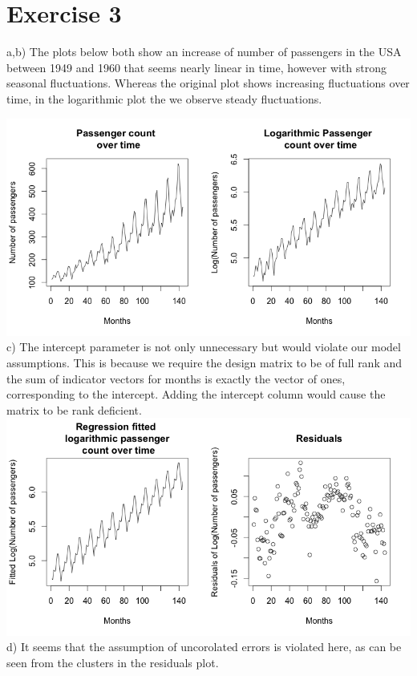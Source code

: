 \documentclass[a4paper,12pt]{article}
\begin{document}
\pagebreak

\section*{Exercise 3}
%
a,b) The plots below both show an increase of number of passengers in the USA between 1949 and 1960 that seems nearly linear in time, however with strong seasonal fluctuations. Whereas the original plot shows increasing fluctuations over time, in the logarithmic plot the we observe steady fluctuations.

\includegraphics[scale = 0.5]{ex3_plot1.png}
\\
c) The intercept parameter is not only unnecessary but would violate our model assumptions. This is because we require the design matrix to be of full rank and the sum of indicator vectors for months is exactly the vector of ones, corresponding to the intercept. Adding the intercept column would cause the matrix to be rank deficient.
\\
\includegraphics[scale = 0.5]{ex3_plot2.png}
\\
d) It seems that the assumption of uncorolated errors is violated here, as can be seen from the clusters in the residuals plot.
\end{document}
